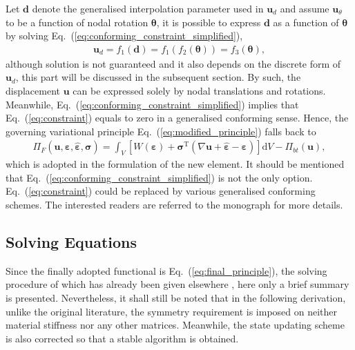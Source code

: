 \documentclass[3p,sort&compress,review,11pt]{elsarticle}
\newcommand*{\md}[1]{\mathrm{d}#1}
\newcommand*{\mT}{\mathrm{T}}
\newcommand*{\eqsref}[1]{Eq.~(\ref{#1})}
\begin{document}
Let $\mathbold{d}$ denote the generalised interpolation parameter used in $\mathbold{u}_d$ and assume $\mathbold{u}_\theta$ to be a function of nodal rotation $\mathbold{\theta}$, it is possible to express $\mathbold{d}$ as a function of $\mathbold{\theta}$ by solving \eqsref{eq:conforming_constraint_simplified},
\begin{gather*}
\mathbold{u}_d=f_1\left(\mathbold{d}\right)=f_1\left(f_2\left(\mathbold{\theta}\right)\right)=f_3\left(\mathbold{\theta}\right),
\end{gather*}
although solution is not guaranteed and it also depends on the discrete form of $\mathbold{u}_d$, this part will be discussed in the subsequent section. By such, the displacement $\mathbold{u}$ can be expressed solely by nodal translations and rotations. Meanwhile, \eqsref{eq:conforming_constraint_simplified} implies that \eqsref{eq:constraint} equals to zero in a generalised conforming sense. Hence, the governing variational principle \eqsref{eq:modified_principle} falls back to
\begin{gather}\label{eq:final_principle}
\varPi_F\left(\mathbold{u},\mathbold{\varepsilon},\hat{\mathbold{\varepsilon}},\mathbold{\sigma}\right)=\int_V\left[W\left(\mathbold{\varepsilon}\right)+\mathbold{\sigma}^\mT\left(\nabla\mathbold{u}+\hat{\mathbold{\varepsilon}}-\mathbold{\varepsilon}\right)\right]\md{V}-\varPi_{bt}\left(\mathbold{u}\right),
\end{gather}
which is adopted in the formulation of the new element. It should be mentioned that \eqsref{eq:conforming_constraint_simplified} is not the only option. \eqsref{eq:constraint} could be replaced by various generalised conforming schemes. The interested readers are referred to the monograph \citep{Long2009} for more details.
\subsection{Solving Equations}
Since the finally adopted functional is \eqsref{eq:final_principle}, the solving procedure of which has already been given elsewhere \citep{Piltner1995,Piltner1999}, here only a brief summary is presented. Nevertheless, it shall still be noted that in the following derivation, unlike the original literature, the symmetry requirement is imposed on neither material stiffness nor any other matrices. Meanwhile, the state updating scheme is also corrected so that a stable algorithm is obtained.
\end{document}
